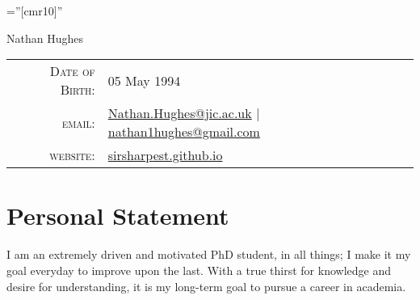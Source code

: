 \documentclass[a4paper,10pt]{article}
\begin{document}

\pagestyle{empty} %

\font\fb=''[cmr10]'' %


\par{\centering
  \vspace{-2ex}
  {\Huge Nathan {Hughes}
  }\bigskip\par}


\begin{center}
  \begin{tabular}{rl}
    \textsc{Date of Birth:} & 05                May 1994 \\
    \textsc{email:}     & \href{mailto:Nathan.Hughes@jic.ac.uk}{Nathan.Hughes@jic.ac.uk} | \href{mailto:nathan1hughes@gmail.com}{nathan1hughes@gmail.com} \\
    \textsc{website:}  & \href{sirsharpest.github.io}{sirsharpest.github.io}
  \end{tabular}
\end{center}


\section{Personal Statement}
I am an extremely driven and motivated PhD student, in all things; I make it my goal everyday to improve upon the last. With a true thirst for knowledge and desire for understanding, it is my long-term goal to pursue a career in academia.
\end{document}
